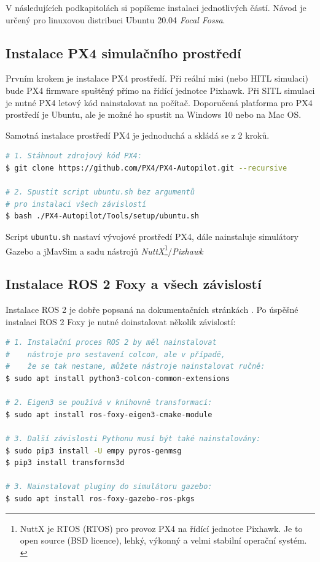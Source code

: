 V následujících podkapitolách si popíšeme instalaci jednotlivých částí. Návod je určený pro linuxovou distribuci Ubuntu 20.04 \textit{Focal Fossa}.

\subsection{Instalace PX4 simulačního prostředí}

Prvním krokem je instalace PX4 prostředí. Při reální misi (nebo \acs{HITL} simulaci) bude PX4 firmware spuštěný přímo na řídící jednotce Pixhawk. Při \acs{SITL} simulaci je nutné PX4 letový kód nainstalovat na počítač. Doporučená platforma pro PX4 prostředí je Ubuntu, ale je možné ho spustit na Windows 10 nebo na Mac OS.

Samotná instalace prostředí PX4 je jednoduchá a skládá se z 2 kroků. \cite{PX4docs}

\begin{lstlisting}[language=bash]
# 1. Stáhnout zdrojový kód PX4:
$ git clone https://github.com/PX4/PX4-Autopilot.git --recursive
 
# 2. Spustit script ubuntu.sh bez argumentů
# pro instalaci všech závislostí
$ bash ./PX4-Autopilot/Tools/setup/ubuntu.sh
\end{lstlisting}

Script \texttt{ubuntu.sh} nastaví vývojové prostředí PX4, dále nainstaluje simulátory Gazebo a jMavSim a sadu nástrojů \textit{NuttX}\footnote{NuttX je \acs{RTOS} (\acl{RTOS}) pro provoz PX4 na řídící jednotce Pixhawk. Je to open source (BSD licence), lehký, výkonný a velmi stabilní operační systém. \cite{PX4docs}}/\textit{Pixhawk}

\subsection{Instalace ROS 2 Foxy a všech závislostí}

Instalace ROS 2 je dobře popsaná na dokumentačních stránkách \cite{ROS2INSTALL}. Po úspěšné instalaci ROS 2 Foxy je nutné doinstalovat několik závislostí:

\begin{lstlisting}[language=bash]
# 1. Instalační proces ROS 2 by měl nainstalovat 
#    nástroje pro sestavení colcon, ale v případě, 
#    že se tak nestane, můžete nástroje nainstalovat ručně:
$ sudo apt install python3-colcon-common-extensions
 
# 2. Eigen3 se používá v knihovně transformací:
$ sudo apt install ros-foxy-eigen3-cmake-module
 
# 3. Další závislosti Pythonu musí být také nainstalovány:
$ sudo pip3 install -U empy pyros-genmsg 
$ pip3 install transforms3d

# 3. Nainstalovat pluginy do simulátoru gazebo:
$ sudo apt install ros-foxy-gazebo-ros-pkgs
\end{lstlisting}

